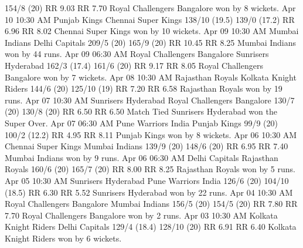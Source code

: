 154/8 (20)
RR 9.03
RR 7.70
Royal Challengers Bangalore won by 8 wickets.
Apr 10
10:30 AM
Punjab Kings
Chennai Super Kings
138/10 (19.5)
139/0 (17.2)
RR 6.96
RR 8.02
Chennai Super Kings won by 10 wickets.
Apr 09
10:30 AM
Mumbai Indians
Delhi Capitals
209/5 (20)
165/9 (20)
RR 10.45
RR 8.25
Mumbai Indians won by 44 runs.
Apr 09
06:30 AM
Royal Challengers Bangalore
Sunrisers Hyderabad
162/3 (17.4)
161/6 (20)
RR 9.17
RR 8.05
Royal Challengers Bangalore won by 7 wickets.
Apr 08
10:30 AM
Rajasthan Royals
Kolkata Knight Riders
144/6 (20)
125/10 (19)
RR 7.20
RR 6.58
Rajasthan Royals won by 19 runs.
Apr 07
10:30 AM
Sunrisers Hyderabad
Royal Challengers Bangalore
130/7 (20)
130/8 (20)
RR 6.50
RR 6.50
Match Tied Sunrisers Hyderabad won the Super Over.
Apr 07
06:30 AM
Pune Warriors India
Punjab Kings
99/9 (20)
100/2 (12.2)
RR 4.95
RR 8.11
Punjab Kings won by 8 wickets.
Apr 06
10:30 AM
Chennai Super Kings
Mumbai Indians
139/9 (20)
148/6 (20)
RR 6.95
RR 7.40
Mumbai Indians won by 9 runs.
Apr 06
06:30 AM
Delhi Capitals
Rajasthan Royals
160/6 (20)
165/7 (20)
RR 8.00
RR 8.25
Rajasthan Royals won by 5 runs.
Apr 05
10:30 AM
Sunrisers Hyderabad
Pune Warriors India
126/6 (20)
104/10 (18.5)
RR 6.30
RR 5.52
Sunrisers Hyderabad won by 22 runs.
Apr 04
10:30 AM
Royal Challengers Bangalore
Mumbai Indians
156/5 (20)
154/5 (20)
RR 7.80
RR 7.70
Royal Challengers Bangalore won by 2 runs.
Apr 03
10:30 AM
Kolkata Knight Riders
Delhi Capitals
129/4 (18.4)
128/10 (20)
RR 6.91
RR 6.40
Kolkata Knight Riders won by 6 wickets.